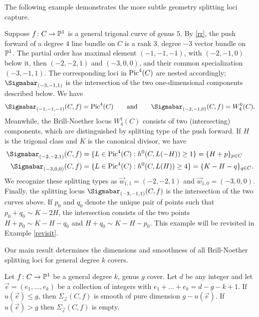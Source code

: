 The following example demonstrates the more subtle geometry splitting loci capture.
\begin{Example} \label{Geoff}
Suppose $f\colon  C \rightarrow \mathbb{P}^1$ is a general trigonal curve of genus $5$.
By \eqref{rr}, the push forward of a degree $4$ line bundle on $C$ is a rank $3$, degree $-3$ vector bundle on $\mathbb{P}^1$.
The partial order has maximal element $(-1,-1,-1)$, with
$(-2,-1,0)$ below it, then $(-2,-2,1)$ and $(-3,0,0)$, and their common
specialization $(-3,-1,1)$. The corresponding loci in $\operatorname{Pic}^4(C)$ are
nested accordingly; $\Sigmabar_{(-3,-1,1)}$ is the intersection of the two
one-dimensional components described below.
We have
\[\Sigmabar_{(-1, -1, -1)}(C, f) = \Pic^4(C) \qquad \text{and} \qquad \Sigmabar_{(-2, -1, 0)}(C, f) = W^0_4(C).\]
Meanwhile, the Brill-Noether locus $W^1_4(C)$ consists of two (intersecting) components, which are distinguished by splitting type of the push forward.
 If $H$ is the trigonal class and $K$ is the canonical divisor, we have
\begin{align*}
\Sigmabar_{(-2, -2, 1)}(C, f) &= \{L \in \Pic^4(C) : h^0(C, L(-H)) \geq 1\} = \{H + p\}_{p \in C} \\
\Sigmabar_{(-3, 0, 0)}(C, f) &=  \{L \in \Pic^4(C) : h^0(C, L(H))  \geq 4\} = \{K - H - q\}_{q \in C}.
\end{align*}
We recognize these splitting types as $\vec{w}_{1,1} = (-2, -2, 1)$ and $\vec{w}_{1,0} = (-3, 0, 0)$.
Finally, the splitting locus $\Sigmabar_{(-3, -1, 1)}(C, f)$ is the intersection of the two curves above.
If $p_0$ and $q_0$ denote the unique pair of points such that $p_0 + q_0 \sim K - 2H$,
the intersection consists of the two points $H + p_0 \sim K - H - q_0$ and $H + q_0 \sim K - H - p_0$. This example will be revisited in Example \ref{revisit}.
\end{Example}


Our main result determines the dimensions and smoothness of all Brill-Noether splitting loci for general degree $k$ covers.
\begin{theorem}
\notready \label{main}
Let $f\colon  C \rightarrow \mathbb{P}^1$ be a general degree $k$, genus $g$ cover.
Let $d$ be any integer and let $\vec{e} = (e_1, \ldots, e_k)$ be a collection of integers with $e_1 + \ldots + e_k = d - g - k + 1$.
If $u(\vec{e}) \leq g$, then $\Sigma_{\vec{e}}(C, f)$ is smooth of pure dimension $g - u(\vec{e})$. If $u(\vec{e}) > g$ then $\Sigma_{\vec{e}}(C, f)$ is empty.
\end{theorem}

